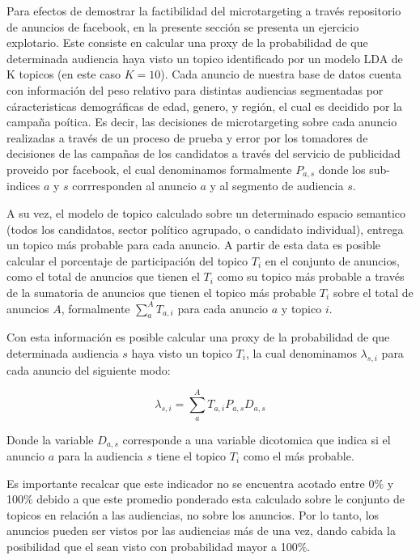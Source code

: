 \documentclass[
  10pt,
  letterpaper,
]{report}
\begin{document}
Para efectos de demostrar la factibilidad del microtargeting a través
repositorio de anuncios de facebook, en la presente sección se presenta
un ejercicio explotario. Este consiste en calcular una proxy de la
probabilidad de que determinada audiencia haya visto un topico
identificado por un modelo LDA de K topicos (en este caso \(K=10\)).
Cada anuncio de nuestra base de datos cuenta con información del peso
relativo para distintas audiencias segmentadas por cáracteristicas
demográficas de edad, genero, y región, el cual es decidido por la
campaña poítica. Es decir, las decisiones de microtargeting sobre cada
anuncio realizadas a través de un proceso de prueba y error por los
tomadores de decisiones de las campañas de los candidatos a través del
servicio de publicidad proveido por facebook, el cual denominamos
formalmente \(P_{a,s}\) donde los sub-indices \(a\) y \(s\)
corrresponden al anuncio \(a\) y al segmento de audiencia \(s\).

A su vez, el modelo de topico calculado sobre un determinado espacio
semantico (todos los candidatos, sector político agrupado, o candidato
individual), entrega un topico más probable para cada anuncio. A partir
de esta data es posible calcular el porcentaje de participación del
topico \(T_{i}\) en el conjunto de anuncios, como el total de anuncios
que tienen el \(T_{i}\) como su topico más probable a través de la
sumatoria de anuncios que tienen el topico más probable \(T_{i}\) sobre
el total de anuncios \(A\), formalmente \(\sum_{a}^{A}T_{a,i}\) para
cada anuncio \(a\) y topico \(i\).

Con esta información es posible calcular una proxy de la probabilidad de
que determinada audiencia \(s\) haya visto un topico \(T_{i}\), la cual
denominamos \(\lambda_{s,i}\) para cada anuncio del siguiente modo:

\[
\lambda_{s,i} = \sum_{a}^{A}T_{a,i}P_{a,s}D_{a,s}
\]

Donde la variable \(D_{a,s}\) corresponde a una variable dicotomica que
indica si el anuncio \(a\) para la audiencia \(s\) tiene el topico
\(T_{i}\) como el más probable.

Es importante recalcar que este indicador no se encuentra acotado entre
0\% y 100\% debido a que este promedio ponderado esta calculado sobre le
conjunto de topicos en relación a las audiencias, no sobre los anuncios.
Por lo tanto, los anuncios pueden ser vistos por las audiencias más de
una vez, dando cabida la posibilidad que el sean visto con probabilidad
mayor a 100\%.
\end{document}
